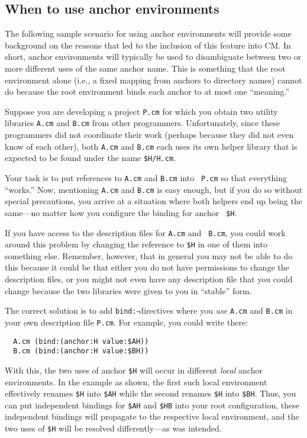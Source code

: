 \subsection{When to use anchor environments}

The following sample scenario for using anchor environments will
provide some background on the reasons that led to the inclusion of
this feature into CM.  In short, anchor environments will typically be
used to disambiguate between two or more different uses of the same
anchor name.  This is something that the root environment alone (i.e.,
a fixed mapping from anchors to directory names) cannot do because the
root environment binds each anchor to at most one ``meaning.''

Suppose you are developing a project {\tt P.cm} for which you obtain
two utility libraries {\tt A.cm} and {\tt B.cm} from other
programmers.  Unfortunately, since these programmers did not
coordinate their work (perhaps because they did not even know of each
other), both {\tt A.cm} and {\tt B.cm} each uses its own helper
library that is expected to be found under the name {\tt \$H/H.cm}.

Your task is to put references to {\tt A.cm} and {\tt B.cm} into {\tt
P.cm} so that everything ``works.''  Now, mentioning {\tt A.cm} and
{\tt B.cm} is easy enough, but if you do so without special
precautions, you arrive at a situation where both helpers end up being
the same---no matter how you configure the binding for anchor {\tt
\$H}.

If you have access to the description files for {\tt A.cm} and {\tt
B.cm}, you could work around this problem by changing the reference to
{\tt \$H} in one of them into something else.  Remember, however, that
in general you may not be able to do this because it could be that
either you do not have permissions to change the description files, or
you might not even have any description file that you could change
because the two libraries were given to you in ``stable'' form.

The correct solution is to add {\tt bind:}-directives where you {\em
use} {\tt A.cm} and {\tt B.cm} in your own description file {\tt P.cm}.
For example, you could write there:

\begin{verbatim}
  A.cm (bind:(anchor:H value:$AH))
  B.cm (bind:(anchor:H value:$BH))
\end{verbatim}

With this, the two uses of anchor {\tt \$H} will occur in different
{\em local} anchor environments.  In the example as shown, the first
such local environment effectively renames {\tt \$H} into {\tt \$AH}
while the second renames {\tt \$H} into {\tt \$BH}. Thus, you can put
independent bindings for {\tt \$AH} and {\tt \$HB} into your root
configuration, these independent bindings will propagate to the
respective local environment, and the two uses of {\tt \$H} will be
resolved differently---as was intended.

